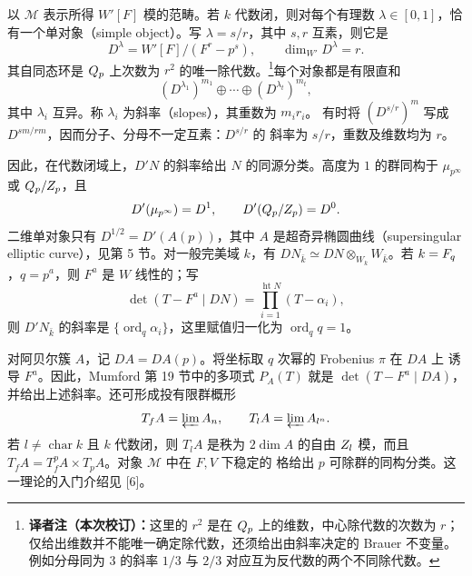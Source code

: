 以 $\mathcal M$ 表示所得 $W'[F]$ 模的范畴。若 $k$ 代数闭，则对每个有理数
$\lambda\in[0,1]$，恰有一个单对象（simple object）。写 $\lambda=s/r$，其中
$s,r$ 互素，则它是
\[
D^\lambda=W'[F]/(F^r-p^s),\qquad \dim_{W'}D^\lambda=r.
\]
其自同态环是 $Q_p$ 上次数为 $r^2$ 的唯一除代数。\footnote{\textbf{译者注（本次校订）：}这里的 $r^2$ 是在 $Q_p$ 上的维数，中心除代数的次数为 $r$；仅给出维数并不能唯一确定除代数，还须给出由斜率决定的 Brauer 不变量。例如分母同为 $3$ 的斜率 $1/3$ 与 $2/3$ 对应互为反代数的两个不同除代数。}每个对象都是有限直和
\[
(D^{\lambda_1})^{m_1}\oplus\cdots\oplus(D^{\lambda_t})^{m_t},
\]
其中 $\lambda_i$ 互异。称 $\lambda_i$ 为斜率（slopes），其重数为 $m_ir_i$。
有时将 $(D^{s/r})^m$ 写成 $D^{sm/rm}$，因而分子、分母不一定互素：$D^{s/r}$ 的
斜率为 $s/r$，重数及维数均为 $r$。

因此，在代数闭域上，$D'N$ 的斜率给出 $N$ 的同源分类。高度为 $1$ 的群同构于
$\mu_{p^\infty}$ 或 $Q_p/Z_p$，且
\[
D'(\mu_{p^\infty})=D^1,\qquad D'(Q_p/Z_p)=D^0.
\]
二维单对象只有 $D^{1/2}=D'(A(p))$，其中 $A$ 是超奇异椭圆曲线（supersingular
elliptic curve），见第 5 节。对一般完美域 $k$，有
$DN_{\bar k}\simeq DN\otimes_{W_k}W_{\bar k}$。若 $k=F_q$，$q=p^a$，则
$F^a$ 是 $W$ 线性的；写
\[
\det(T-F^a\mid DN)=\prod_{i=1}^{\operatorname{ht}N}(T-\alpha_i),
\]
则 $D'N_{\bar k}$ 的斜率是 $\{\operatorname{ord}_q\alpha_i\}$，这里赋值归一化为
$\operatorname{ord}_q q=1$。

对阿贝尔簇 $A$，记 $DA=DA(p)$。将坐标取 $q$ 次幂的 Frobenius $\pi$ 在 $DA$ 上
诱导 $F^a$。因此，Mumford 第 19 节中的多项式 $P_A(T)$ 就是
$\det(T-F^a\mid DA)$，并给出上述斜率。还可形成投有限群概形
\[
T_fA=\varprojlim A_n,\qquad T_lA=\varprojlim A_{l^n}.
\]
若 $l\ne\operatorname{char}k$ 且 $k$ 代数闭，则 $T_lA$ 是秩为 $2\dim A$ 的自由
$Z_l$ 模，而且 $T_fA=T_f^pA\times T_pA$。对象 $\mathcal M$ 中在 $F,V$ 下稳定的
格给出 $p$ 可除群的同构分类。这一理论的入门介绍见 [6]。

